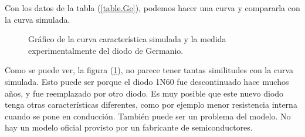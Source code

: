 \documentclass[chaptersright]{informeutn}
\begin{document}
      Con los datos de la tabla (\ref{table.Ge}), podemos hacer una curva y compararla con la curva simulada.
      \begin{figure}[!ht]
        \centering
        \caption{Gráfico de la curva característica simulada y la medida experimentalmente del diodo de Germanio.}
        \label{graph.comparativa.Ge}
      \end{figure}

      Como se puede ver, la figura (\ref{graph.comparativa.Ge}), no parece tener tantas similitudes con la curva
      simulada. Esto puede ser porque el diodo 1N60 fue descontinuado hace muchos años, y fue reemplazado por otro
      diodo. Es muy posible que este nuevo diodo tenga otras características diferentes, como por ejemplo menor
      resistencia interna cuando se pone en conducción. También puede ser un problema del modelo. No hay un modelo
      oficial provisto por un fabricante de semiconductores.
\end{document}
